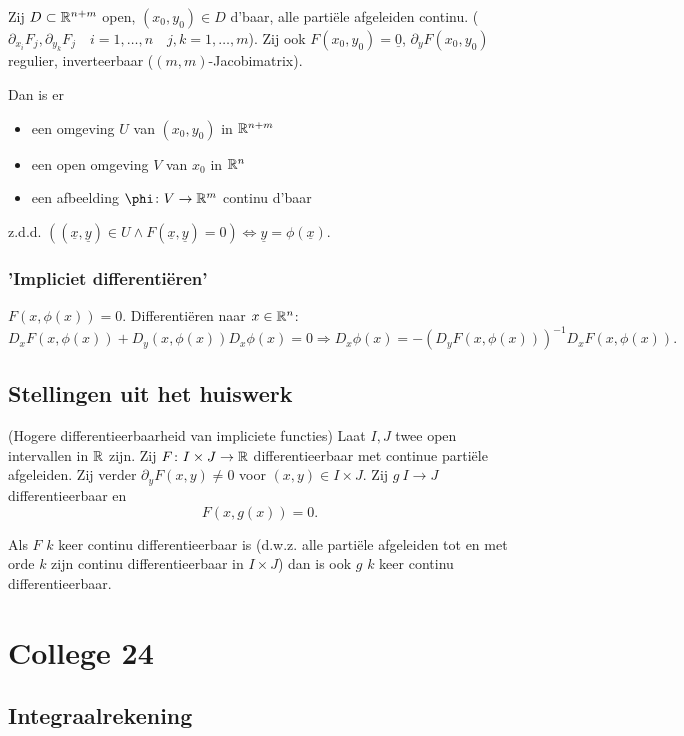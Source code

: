 \documentclass{2wa40summary}
\begin{document}
				 Zij $ D\subset \mathbb{R}^{n+m} $ open, $ (x_0, y_0) \in D $ d'baar, alle parti\"ele afgeleiden continu. ($ \partial_{x_i}F_j , \partial_{y_k}F_j \quad i=1,\dots,n \quad j,k=1,\dots,m $). Zij ook $ F(x_0, y_0) = \underline{0}$, $ \partial_y F(x_0,y_0) $ regulier, inverteerbaar ($ (m,m) $-Jacobimatrix).
				
				Dan is er \begin{itemize}
					\item[] een omgeving $ U $ van $ (x_0,y_0) $ in $ \mathbb{R}^{n+m} $
					\item[] een open omgeving $V$ van $x_0$ in $\mathbb{R}^n$
					\item[] een afbeelding $ \phi \:  V\to \reals^m $ continu d'baar 
				\end{itemize}
				z.d.d. $ ((\underline{x},\underline{y}) \in U \wedge F(\underline{x},\underline{y})=0) \Leftrightarrow \underline{y}=\phi (\underline{x}). $
				
			\subsubsection{'Impliciet differenti\"eren'}
				$ F(x,\phi(x))=0 $. Differenti\"eren naar $ x\in \mathbb{R}^n $:
				\[ D_x F(x,\phi(x)) + D_y (x,\phi(x))D_x \phi(x) = 0 \Rightarrow D_x \phi(x) = -(D_y F(x,\phi(x)))^{-1} D_x F(x,\phi(x)). \]
				
		\subsection{Stellingen uit het huiswerk}
			\theorem (Hogere differentieerbaarheid van impliciete functies)
				Laat $I,J$ twee open intervallen in $ \mathbb{R} $ zijn. Zij $F\colon I \times J \to \mathbb{R}$ differentieerbaar met continue parti\"ele afgeleiden. Zij verder $\partial_y F(x,y) \neq 0$ voor $(x,y) \in I \times J$. Zij $g\: I\to J$ differentieerbaar en \[ F(x,g(x)) = 0. \]
				
				Als $F$ $k$ keer continu differentieerbaar is (d.w.z. alle parti\"ele afgeleiden tot en met orde $k$ zijn continu differentieerbaar in $I \times J$) dan is ook $g$ $k$ keer continu differentieerbaar.		
				
		\newpage		
		\section{College 24}
		\subsection{Integraalrekening} 
\end{document}
